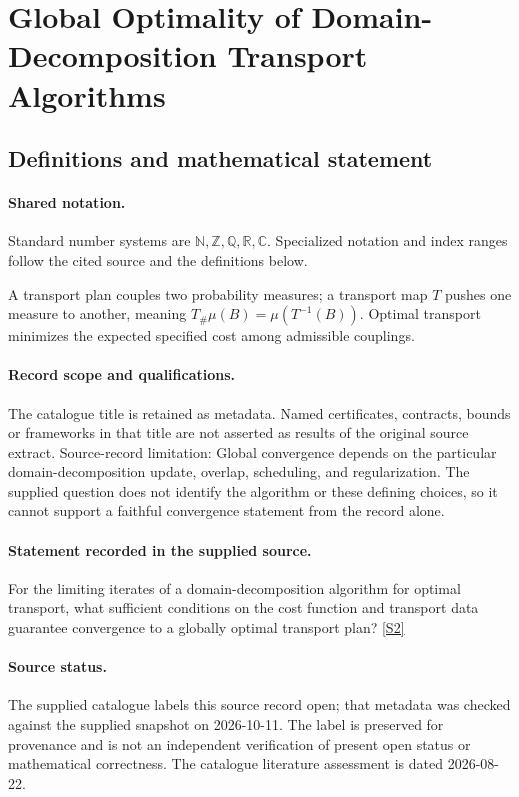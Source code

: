 \documentclass[11pt]{article}
\newcommand{\sref}[2]{\hyperlink{source:#1:#2}{[S#2]}}
\begin{document}
\section{Global Optimality of Domain-Decomposition Transport Algorithms}\label{statement}

\subsection{Definitions and mathematical statement}

\paragraph{Shared notation.}Standard number systems are $\mathbb N,\mathbb Z,\mathbb Q,\mathbb R,\mathbb C$. Specialized notation and index ranges follow the cited source and the definitions below.


A transport plan couples two probability measures; a transport map $T$ pushes one measure to another, meaning $T_\#\mu(B)=\mu(T^{-1}(B))$. Optimal transport minimizes the expected specified cost among admissible couplings.
\paragraph{Record scope and qualifications.}
The catalogue title is retained as metadata. Named certificates, contracts, bounds or frameworks in that title are not asserted as results of the original source extract.
Source-record limitation: Global convergence depends on the particular domain-decomposition update, overlap, scheduling, and regularization. The supplied question does not identify the algorithm or these defining choices, so it cannot support a faithful convergence statement from the record alone.
\paragraph{Statement recorded in the supplied source.}
For the limiting iterates of a domain-decomposition algorithm for optimal transport, what sufficient conditions on the cost function and transport data guarantee convergence to a globally optimal transport plan? \sref{statement}{2}
\paragraph{Source status.}
The supplied catalogue labels this source record open; that metadata was checked against the supplied snapshot on 2026-10-11. The label is preserved for provenance and is not an independent verification of present open status or mathematical correctness. The catalogue literature assessment is dated 2026-08-22.
\end{document}
